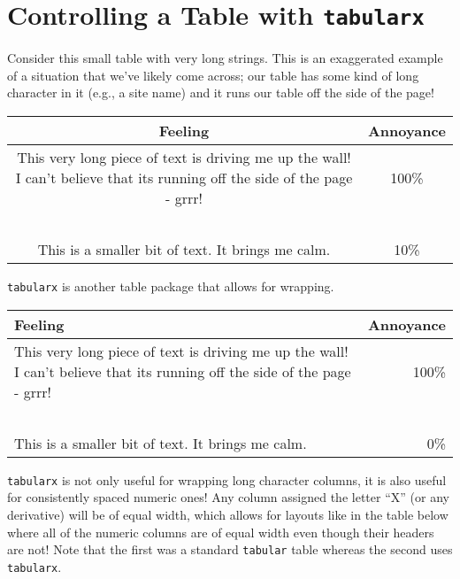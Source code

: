 \documentclass{article}
\begin{document}
\section{Controlling a Table with \texttt{tabularx}}

Consider this small table with very long strings. This is an exaggerated example of a situation that we've likely come across; our table has some kind of long character in it (e.g., a site name) and it runs our table off the side of the page! 

\begin{table}[h!]
    \centering
    \begin{tabular}{c|c}
    \toprule
        Feeling & Annoyance \\
    \midrule
        This very long piece of text is driving me up the wall! I can't believe that its running off the side of the page - grrr! & 100\% \\~\\
        This is a smaller bit of text. It brings me calm. & 10\% \\
    \bottomrule
    \end{tabular}
\end{table}

\texttt{tabularx} is another table package that allows for wrapping. 

\begin{table}[h!]
    \centering
    \begin{tabularx}{\linewidth}{Xr}
    \toprule
        Feeling & Annoyance \\
    \midrule
        This very long piece of text is driving me up the wall! I can't believe that its running off the side of the page - grrr! & 100\% \\~\\
        This is a smaller bit of text. It brings me calm. & 0\% \\
    \bottomrule
    \end{tabularx}
\end{table}

\texttt{tabularx} is not only useful for wrapping long character columns, it is also useful for consistently spaced numeric ones! Any column assigned the letter ``X'' (or any derivative) will be of equal width, which allows for layouts like in the table below where all of the numeric columns are of equal width even though their headers are not! Note that the first was a standard \texttt{tabular} table whereas the second uses \texttt{tabularx}.
\end{document}
